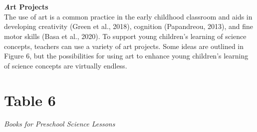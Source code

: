 \documentclass[11.5pt]{sig-alternate}
\begin{document}
\begin{large}
\\\\
\textbf{\emph Art Projects }
\\
The use of art is a common practice in the early childhood classroom and aids in developing creativity (Green et al., 2018), cognition (Papandreou, 2013), and fine motor skills (Basa et al., 2020). To support young children’s learning of science concepts, teachers can use a variety of art projects. Some ideas are outlined in Figure 6, but the possibilities for using art to enhance young children’s learning of science concepts are virtually endless.

\section*{Table 6}
\textit{Books for Preschool Science Lessons}\\\\
\noindent\begin{minipage}{\linewidth}
\end{minipage}
\\\\

\end{large}
\end{document}
